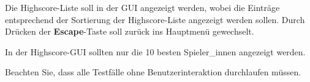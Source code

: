 Die Highscore-Liste soll in der GUI angezeigt werden, wobei die
Eintr\"age entsprechend der Sortierung der Highscore-Liste angezeigt
werden sollen. Durch Drücken der \textbf{Escape}-Taste soll zurück ins Hauptmenü gewechselt.

In der Highscore-GUI sollten nur die 10 besten Spieler\_innen angezeigt werden.

Beachten Sie, dass alle Testf\"alle ohne Benutzerinteraktion durchlaufen m\"ussen.
